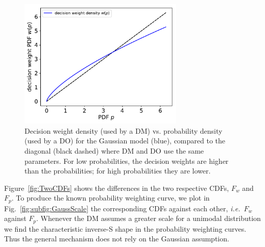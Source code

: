 \documentclass[a4paper, 12pt]{article}
\newcommand{\flabel}[1]{\label{fig:#1}}
\newcommand{\fref}[1]{Fig.~\ref{fig:#1}}
\newcommand{\Fref}[1]{Figure~\ref{fig:#1}}
\newcommand{\ie}{{\it i.e.}\ }
\newcommand{\ND}{\mathcal{N}} %
\begin{document}
\begin{figure}[htb]
\centering
\includegraphics[width=0.7\textwidth]{./figs/decision_weights.pdf}
\caption{Decision weight density (used by a DM) vs. probability density (used by a DO) for the Gaussian model (blue), compared to the diagonal (black dashed) where DM and DO use the same parameters. For low probabilities, the decision weights are higher than the probabilities; for high probabilities they are lower.}
\flabel{probability_weights}
\end{figure}

\Fref{TwoCDFs} shows the differences in the two respective CDFs, $F_w$ and $F_p$. To produce the known probability weighting curve, we plot in \fref{subfig:GaussScale} the corresponding CDFs against each other, \ie $F_w$ against $F_p$. Whenever the DM assumes a greater scale for a unimodal distribution we find the characteristic inverse-S shape in the probability weighting curves. Thus the general mechanism does not rely on the Gaussian assumption.


\end{document}
